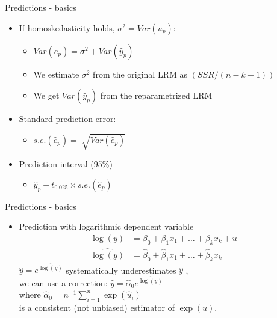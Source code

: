 \documentclass{beamer}
\begin{document}
\begin{frame}{Predictions - basics}
\begin{itemize}
\item If homoskedasticity holds, $\sigma^2 = Var(u_p)$: \\

\begin{itemize}
\item $Var(\hat{e}_p) = \sigma^2 + Var(\hat{y}_p)$
\vspace{0.2cm}
\item We estimate $\sigma^2$ from the original LRM as $(\textit{SSR}/(n-k-1))$
\vspace{0.2cm}
\item We get $Var(\hat{y}_p)$ from the reparametrized LRM
\end{itemize}
\vspace{0.5cm}
\item Standard prediction error:
\begin{itemize}
\vspace{0.2cm}
 \item $\textit{s.e.}(\hat{e}_p) = \sqrt[]{Var(\hat{e}_p)}$
\end{itemize}
\vspace{0.5cm}
\item Prediction interval (95\%)
\vspace{0.2cm}
\begin{itemize}
\item $\hat{y}_p \pm t_{0.025} \times \textit{s.e.}(\hat{e}_p) $
\end{itemize}
\end{itemize}
\end{frame}


\begin{frame}{Predictions - basics}
\begin{itemize}
\item Prediction with logarithmic dependent variable
\begin{align}\nonumber
\log(y) &= \beta_0 + \beta_1 x_1 + \dots + \beta_k x_k + u\\\nonumber
\widehat{\log(y)} &= \hat{\beta}_0 + \hat{\beta}_1 x_1 + \dots + \hat{\beta}_k x_k 
\end{align}
$\hat{y} =e^{\widehat{\log(y)}}$ systematically underestimates $\hat{y}$ , \\
\vspace{0.3cm}
we can use a correction: $\hat{y}=\widehat{\alpha}_0 e^{\widehat{\log(y)}}$ \\
\vspace{0.3cm}
where $\widehat{\alpha}_0 = n^{-1} \sum_{i=1}^n \exp(\hat{u}_i)$ \\
\vspace{0.3cm}
is a consistent (not unbiased) estimator of $\exp{(u)}$.
\end{itemize}
\end{frame}
\end{document}
